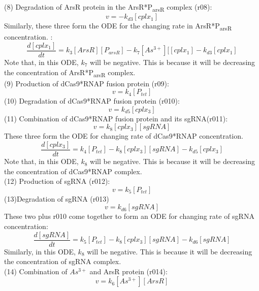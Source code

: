 (8) Degradation of ArsR protein in the  ArsR*P\textsubscript{arsR} complex (r08):
\begin{displaymath}
v=-k_{d3}[cplx_1]
\end{displaymath}
Similarly, these three form the ODE for the changing rate in ArsR*P\textsubscript{arsR} concentration.  :
\begin{equation}
\frac{d[cplx_1]}{dt}=k_3[ArsR][P_{arsR}]-k_7[As^{3+}][[cplx_1]-k_{d3}[cplx_1] \tag{3}
\end{equation}
Note that, in this ODE, $k_7$ will be negative. This is because it will be decreasing the concentration of  ArsR*P\textsubscript{arsR} complex.\\
(9) Production of dCas9*RNAP fusion protein (r09):
\begin{displaymath}
v=k_4[P_{tet}]
\end{displaymath}
(10) Degradation of dCas9*RNAP fusion protein (r010):
\begin{displaymath}
v=k_{d5}[cplx_3]
\end{displaymath}
(11) Combination of dCas9*RNAP fusion protein and its sgRNA(r011):
\begin{displaymath}
v=k_{8}[cplx_3][sgRNA]
\end{displaymath}
These three form the ODE for changing rate of dCas9*RNAP concentration.
\begin{equation}
\frac{d[cplx_3]}{dt}=k_4[P_{tet}]-k_{8}[cplx_3][sgRNA]-k_{d5}[cplx_3] \tag{4}
\end{equation}
Note that, in this ODE, $k_8$ will be negative. This is because it will be decreasing the concentration of  dCas9*RNAP complex.\\
(12) Production of sgRNA (r012):
\begin{displaymath}
v=k_5[P_{tet}]
\end{displaymath}
(13)Degradation of sgRNA (r013)
\begin{displaymath}
v=k_{d6}[sgRNA]
\end{displaymath}
These two plus r010 come together to form an ODE for changing rate of sgRNA concentration:
\begin{equation}
\frac{d[sgRNA]}{dt}=k_5[P_{tet}]-k_{8}[cplx_3][sgRNA]-k_{d6}[sgRNA] \tag{5}
\end{equation}
Similarly, in this ODE, $k_8$ will be negative. This is because it will be decreasing the concentration of sgRNA complex.\\
(14) Combination of $As^{3+}$ and ArsR protein (r014):
\begin{displaymath}
v=k_{6}[As^{3+}][ArsR]
\end{displaymath}

